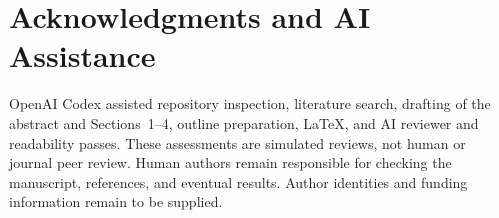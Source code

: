 \documentclass[letterpaper,journal]{IEEEtran}
\begin{document}
\section*{Acknowledgments and AI Assistance}
OpenAI Codex assisted repository inspection, literature search, drafting of the abstract and Sections~1--4, outline preparation, LaTeX, and AI reviewer and readability passes. These assessments are simulated reviews, not human or journal peer review. Human authors remain responsible for checking the manuscript, references, and eventual results. Author identities and funding information remain to be supplied.



\end{document}

